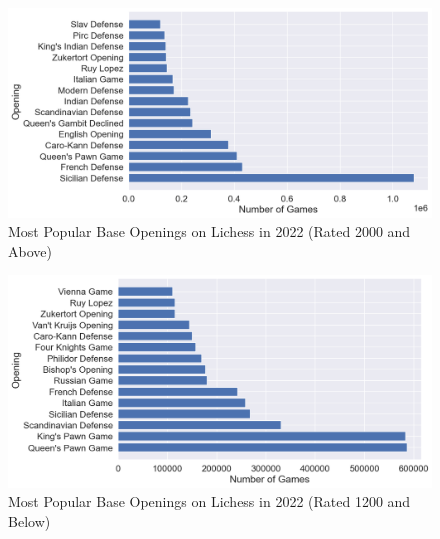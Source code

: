 \documentclass[a4paper, 11pt]{article}
\begin{document}
\begin{appendices}
\begin{figure}[H]
    \centering
    \caption{Most Popular Base Openings on Lichess in 2022 (Rated 2000 and Above)}
    \label{fig:mostPopularOpeningsRated2000Plus}
    \includegraphics[width=\textwidth]{Most Popular Base Openings (Rated 2000+).png}
\end{figure}

\begin{figure}[H]
    \centering
    \caption{Most Popular Base Openings on Lichess in 2022 (Rated 1200 and Below)}
    \label{fig:mostPopularOpeningsRated1200Minus}
    \includegraphics[width=\textwidth]{Most Popular Base Openings (Rated 1200-).png}
\end{figure}


\end{appendices}
\end{document}

